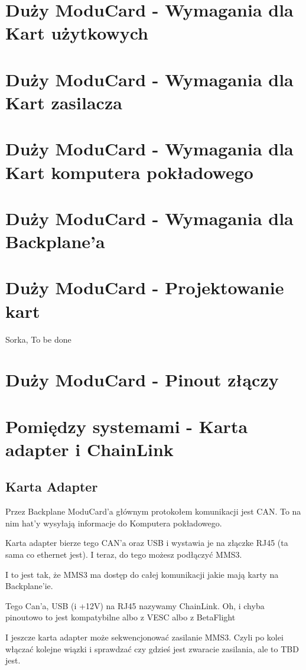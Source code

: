 \documentclass[b5paper, 10pt, twoside]{book}
\begin{document}
\section{Duży ModuCard - Wymagania dla Kart użytkowych}
\section{Duży ModuCard - Wymagania dla Kart zasilacza}
\section{Duży ModuCard - Wymagania dla Kart komputera pokładowego}
\section{Duży ModuCard - Wymagania dla Backplane'a}
\section{Duży ModuCard - Projektowanie kart} \label{Duży ModuCard - Projektowanie kart}
Sorka, To be done
\section{Duży ModuCard - Pinout złączy}

\section{Pomiędzy systemami - Karta adapter i ChainLink} \label{karta_adapter}
\subsection{Karta Adapter}
Przez Backplane ModuCard'a głównym protokołem komunikacji jest CAN. To na nim hat'y wysyłają informacje do Komputera pokładowego.

Karta adapter bierze tego CAN'a oraz USB i wystawia je na złączke RJ45 (ta sama co ethernet jest). I teraz, do tego możesz podłączyć MMS3.

I to jest tak, że MMS3 ma dostęp do całej komunikacji jakie mają karty na Backplane'ie.

Tego Can'a, USB (i +12V) na RJ45 nazywamy ChainLink. Oh, i chyba pinoutowo to jest kompatybilne albo z VESC albo z BetaFlight

I jeszcze karta adapter może sekwencjonować zasilanie MMS3. Czyli po kolei włączać kolejne wiązki i sprawdzać czy gdzieś jest zwaracie zasilania, ale to TBD jest.
\end{document}
